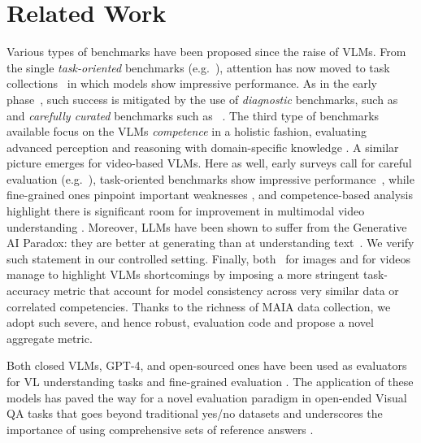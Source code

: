 \section{Related Work}
\label{sec:related_work}





Various types of benchmarks have been proposed since the raise of VLMs. From the single \emph{task-oriented} benchmarks (e.g.~\citet{antol:vqa15,visdial}), attention has now moved to task collections~\cite{lvlmehubbenchmark,lee:vhelm24} in which models show impressive performance. As in the early phase~\cite{johnson2017clevr,shekhar-etal-2017-foil,suhr-etal-2017-corpus}, such success is mitigated by the use of \emph{diagnostic} benchmarks, such as~\citet{valse,thrush:winoground22,chen-etal-2023-bla, bugliarello-etal-2023-measuring,bianchi2024devil} and \emph{carefully curated} benchmarks such as~\citet{xio:nextGQA24,tong2024eyes} . The third type of benchmarks available focus on the VLMs \emph{competence} in a holistic fashion,  evaluating advanced perception and reasoning with domain-specific knowledge \cite{mmmlu23}. A similar picture emerges for video-based VLMs. Here as well, early surveys call for careful evaluation (e.g.~\citet{zhong-etal-2022-video}), task-oriented benchmarks show impressive performance~\cite{GrundeMcLaughlin2021AGQA,zhou:anetqa23}, while fine-grained ones pinpoint important weaknesses \cite{vilma}, and competence-based analysis highlight there is significant room for improvement in multimodal video understanding \citep{patraucean2023perception}. Moreover, LLMs have been shown to suffer from the Generative AI Paradox: they are better at generating than at understanding text~\cite{west2024the}. We verify such statement in our controlled setting.  Finally, both~\citet{tong2024eyes} for images and \citet{vilma} for videos manage to highlight VLMs shortcomings by imposing a more stringent task-accuracy metric that account for model consistency across very similar data or correlated competencies. Thanks to the richness of MAIA data collection, we adopt such severe, and hence robust, evaluation code and propose a novel aggregate metric.


Both closed VLMs, GPT-4, and open-sourced ones have been used as evaluators for VL understanding tasks and fine-grained evaluation \cite{fang2024mmbenchvideo,lee-etal-2024-prometheus}. The application of these models has paved the way for a novel evaluation paradigm in open-ended Visual QA tasks that goes beyond traditional yes/no datasets \cite{vqamatter, okvqa} and underscores the importance of using comprehensive sets of reference answers \citep{vqa_evaluation_manos}. 

